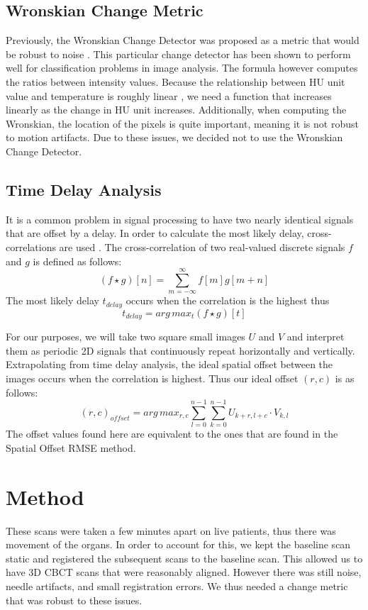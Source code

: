 \documentclass[]{spie}  %
\begin{document}
\subsection{Wronskian Change Metric}

Previously, the Wronskian Change Detector \cite{Durucan01} was proposed as a metric that would be robust to noise \cite{Li13}. This particular change detector has been shown to perform well for classification problems \cite{Panda13,Durucan01,Ang11,Subudhi13} in image analysis. The formula however computes the ratios between intensity values. Because the relationship between HU unit value and temperature is roughly linear \cite{Fani14}, we need a function that increases linearly as the change in HU unit increases. Additionally, when computing the Wronskian, the location of the pixels is quite important, meaning it is not robust to motion artifacts. Due to these issues, we decided not to use the Wronskian Change Detector. 

\subsection{Time Delay Analysis}

It is a common problem in signal processing to have two nearly identical signals that are offset by a delay. In order to calculate the most likely delay, cross-correlations are used \cite{Rhudy09}. The cross-correlation of two real-valued discrete signals $f$ and $g$ is defined as follows:
\[
(f \star g)[n] = \sum_{m=-\infty}^{\infty}{f[m]g[m+n]}
\]
The most likely delay $t_{delay}$ occurs when the correlation is the highest thus
\[
t_{delay} = arg\,max_t (f \star g)[t]
\]

For our purposes, we will take two square small images $U$ and $V$ and interpret them as periodic 2D signals that continuously repeat horizontally and vertically. Extrapolating from time delay analysis, the ideal spatial offset between the images occurs when the correlation is highest. Thus our ideal offset $(r,c)$ is as follows:
\[
(r,c)_{offset} = arg\,max_{r,c} \sum_{l=0}^{n-1} \sum_{k=0}^{n-1} {U_{k+r,l+c} \cdot V_{k,l}}
\]
The offset values found here are equivalent to the ones that are found in the Spatial Offset RMSE method. 

\section{Method}

These scans were taken a few minutes apart on live patients, thus there was movement of the organs. In order to account for this, we kept the baseline scan static and registered the subsequent scans to the baseline scan. This allowed us to have 3D CBCT scans that were reasonably aligned. However there was still noise, needle artifacts, and small registration errors. We thus needed a change metric that was robust to these issues. 
\end{document}
